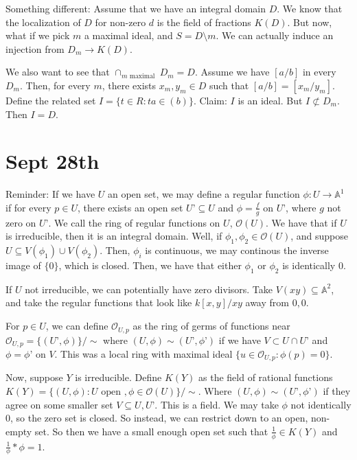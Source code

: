 \documentclass[10pt]{article}
\begin{document}
Something different: Assume that we have an integral domain $D$. We know that the localization of $D$ for non-zero $d$ is the field of fractions $K(D)$. But now, what if we pick $m$ a maximal ideal, and $S = D \setminus m$. We can actually induce an injection from $D_m \to K(D)$.

We also want to see that $\cap_{m \text{ maximal }} D_m = D$. Assume we have $[a/b]$ in every $D_m$. Then, for every $m$, there exists $x_m, y_m \in D$ such that $[a/b] = [x_m/y_m]$. Define the related set $I = \{ t \in R : ta \in (b) \}$. Claim: $I$ is an ideal. But $I \not \subset D_m$. Then $I = D$.

\section{Sept 28th}

Reminder: If we have $U$ an open set, we may define a regular function $\phi: U \to \mathbb{A}^1$ if for every $p \in U$, there exists an open set $U’ \subseteq U$ and $\phi = \frac{f}{g}$ on $U’$, where $g$ not zero on $U’$. We call the ring of regular functions on $U$, $\mathcal{O}(U)$. We have that if $U$ is irreducible, then it is an integral domain. Well, if $\phi_1, \phi_2 \in \mathcal{O}(U)$, and suppose $U \subseteq V(\phi_1) \cup V(\phi_2)$. Then, $\phi_i$ is continuous, we may continous the inverse image of $\{ 0 \}$, which is closed. Then, we have that either $\phi_1$ or $\phi_2$ is identically $0$.

If $U$ not irreducible, we can potentially have zero divisors. Take $V(xy) \subseteq \mathbb{A}^2$, and take the regular functions that look like $k[x,y]/xy$ away from $0,0$.

For $p \in U$, we can define $\mathcal{O}_{U,p}$ as the ring of germs of functions near $\mathcal{O}_{U,p} = \{ (U’, \phi)  \} / \sim$ where $(U, \phi) \sim (U’, \phi’)$ if we have $V \subset U \cap U’$ and $\phi = \phi’$ on $V$. This was a local ring with maximal ideal $\{ u \in \mathcal{O}_{U,p} : \phi(p) = 0 \}$.

Now, suppose $Y$ is irreducible. Define $K(Y)$ as the field of rational functions $K(Y) = \{ (U,\phi) : U \text { open }, \phi \in \mathcal{O}(U) \} / \sim$. Where $(U, \phi) \sim (U’, \phi’)$ if they agree on some smaller set $V\subseteq U, U’$. This is a field. We may take $\phi$ not identically $0$, so the zero set is closed. So instead, we can restrict down to an open, non-empty set. So then we have a small enough open set such that $\frac{1}{\phi} \in K(Y)$ and $\frac{1}{\phi}  * \phi = 1$.
\end{document}
